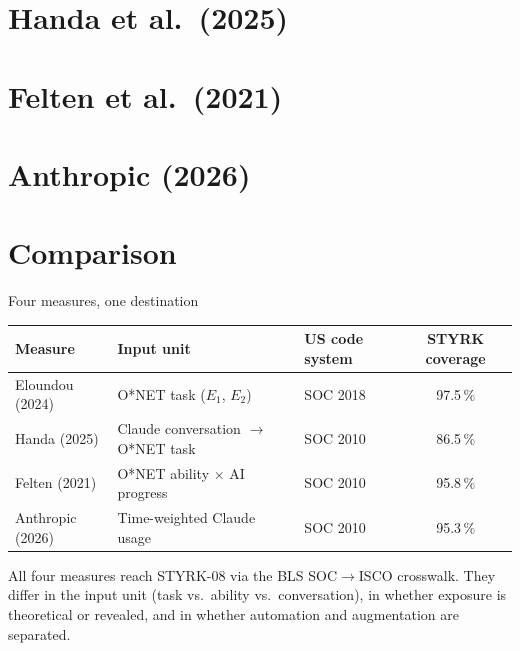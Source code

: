 \documentclass[aspectratio=169,11pt]{beamer}
\begin{document}
\section{Handa et al.\ (2025)}


\section{Felten et al.\ (2021)}


\section{Anthropic (2026)}


\section*{Comparison}

\begin{frame}{Four measures, one destination}
\centering\small
\begin{tabular}{lllc}
\toprule
Measure & Input unit & US code system & STYRK coverage \\
\midrule
Eloundou (2024)   & O*NET task ($E_1$, $E_2$)              & SOC 2018 & 97.5\,\% \\
Handa (2025)      & Claude conversation $\to$ O*NET task   & SOC 2010 & 86.5\,\% \\
Felten (2021)     & O*NET ability $\times$ AI progress     & SOC 2010 & 95.8\,\% \\
Anthropic (2026)  & Time-weighted Claude usage             & SOC 2010 & 95.3\,\% \\
\bottomrule
\end{tabular}
\vspace{1em}

\justifying\small
All four measures reach STYRK-08 via the BLS SOC$\to$ISCO crosswalk. They differ in the input unit (task vs.\ ability vs.\ conversation), in whether exposure is theoretical or revealed, and in whether automation and augmentation are separated.
\end{frame}
\end{document}
